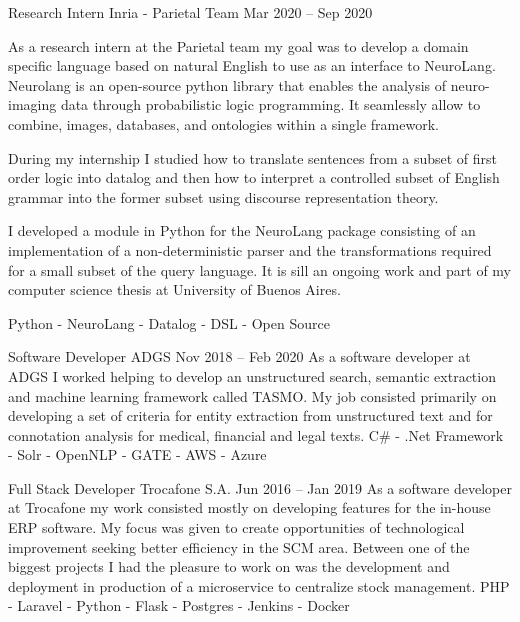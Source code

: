 \documentclass[10pt,a4paper]{article}
\begin{document}
\jobdescription
    { Research Intern }
    { Inria - Parietal Team }
    { Mar 2020 -- Sep 2020 }
    { 
        As a research intern at the Parietal team my goal was to develop a domain specific language based on natural English to use as an interface to NeuroLang. Neurolang is an open-source python library that enables the analysis of neuro-imaging data through probabilistic logic programming. It seamlessly allow to combine, images, databases, and ontologies within a single framework.

        During my internship I studied how to translate sentences from a subset of first order logic into datalog and then how to interpret a controlled subset of English grammar into the former subset using discourse representation theory.

        I developed a module in Python for the NeuroLang package consisting of an implementation of a non-deterministic parser and the transformations required for a small subset of the query language. It is sill an ongoing work and part of my computer science thesis at University of Buenos Aires.
    }
    {
        Python - NeuroLang - Datalog - DSL - Open Source
    }

\jobdescription
    { Software Developer }
    { ADGS }
    { Nov 2018 -- Feb 2020 }
    { 
        As a software developer at ADGS I worked helping to develop an unstructured search, semantic extraction and machine learning framework called TASMO. My job consisted primarily on developing a set of criteria for entity extraction from unstructured text and for connotation analysis for medical, financial and legal texts.
    }
    {
        C\# - .Net Framework - Solr - OpenNLP - GATE - AWS - Azure
    }

\jobdescription
    { Full Stack Developer }
    { Trocafone S.A. }
    { Jun 2016 -- Jan 2019 }
    { 
        As a software developer at Trocafone my work consisted mostly on developing features for the in-house ERP software. My focus was given to create opportunities of technological improvement seeking better efficiency in the SCM area. Between one of the biggest projects I had the pleasure to work on was the development and deployment in production of a microservice to centralize stock management.
    }
    {
        PHP - Laravel - Python - Flask - Postgres - Jenkins - Docker
    }
\end{document}
